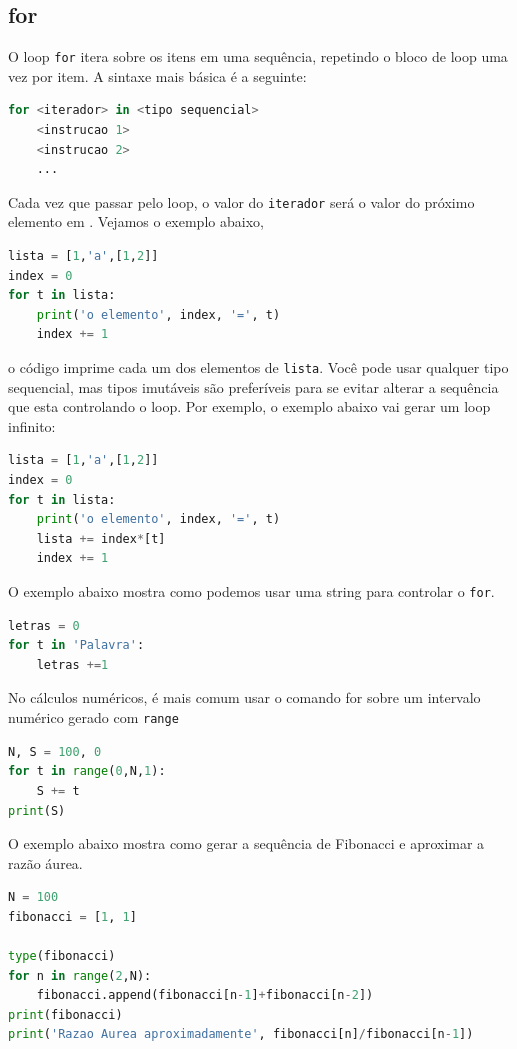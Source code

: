 \subsection{for}
O loop {\tt for} itera sobre os itens em uma sequência, repetindo o bloco de loop uma vez
por item. A sintaxe mais básica é a seguinte:
\begin{lstlisting}[language=Python]
for <iterador> in <tipo sequencial>
    <instrucao 1>
    <instrucao 2>
    ...
\end{lstlisting}
Cada vez que passar pelo loop, o valor do {\tt iterador} será o valor do
próximo elemento em {\tt <tipo sequencial>} . Vejamos o exemplo abaixo, 
\begin{lstlisting}[language=Python]
lista = [1,'a',[1,2]]
index = 0
for t in lista:
    print('o elemento', index, '=', t)
    index += 1
\end{lstlisting}
o código imprime cada um dos elementos de {\tt lista}.
Você pode usar qualquer tipo sequencial, mas tipos imutáveis são preferíveis para se evitar alterar a sequência que esta controlando o loop. Por exemplo, o exemplo abaixo vai gerar um loop infinito:
\begin{lstlisting}[language=Python]
lista = [1,'a',[1,2]]
index = 0
for t in lista:
    print('o elemento', index, '=', t)
    lista += index*[t]
    index += 1
\end{lstlisting}

O exemplo abaixo mostra como podemos usar uma string para controlar o {\tt for}.
\begin{lstlisting}[language=Python]
letras = 0
for t in 'Palavra':
    letras +=1
\end{lstlisting}
No cálculos numéricos, é mais comum usar o comando for sobre um intervalo numérico gerado com {\tt range}
\begin{lstlisting}[language=Python]
N, S = 100, 0
for t in range(0,N,1):
    S += t 
print(S)    
\end{lstlisting}

O exemplo abaixo mostra como gerar a sequência de Fibonacci e aproximar a razão áurea.
\begin{lstlisting}[language=Python, frame=lines,basicstyle=\footnotesize, caption={Sequência de Fibonacci e a Razão Áurea }, label={lst:fibonacci}]
N = 100
fibonacci = [1, 1]

type(fibonacci)
for n in range(2,N):
    fibonacci.append(fibonacci[n-1]+fibonacci[n-2])
print(fibonacci)
print('Razao Aurea aproximadamente', fibonacci[n]/fibonacci[n-1])
\end{lstlisting}

